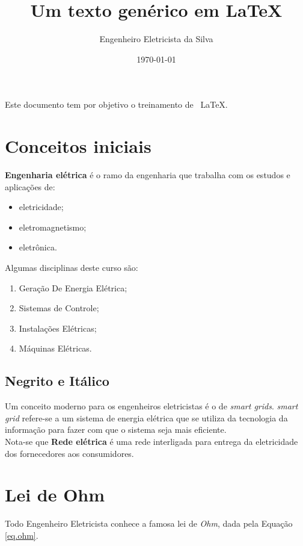 \documentclass[12pt, twocolumn]{article}
\title{Um texto genérico em \LaTeX}
\author{Engenheiro Eletricista da Silva}
\date{\today}
\begin{document}
    \tableofcontents
    \maketitle
    
    Este documento tem por objetivo o treinamento de \ \LaTeX.
    
    \section{Conceitos iniciais}
        
    \textbf{Engenharia elétrica} é o ramo da engenharia que trabalha com os estudos e aplicações de:
    \begin{itemize}
        \item eletricidade;
        \item eletromagnetismo;
        \item eletrônica.
    \end{itemize}
    
    Algumas disciplinas deste curso são: 
    \begin{enumerate}
        \item Geração De Energia Elétrica;
        \item Sistemas de Controle;
        \item Instalações Elétricas;
        \item Máquinas Elétricas.
    \end{enumerate}
    
    \subsection{Negrito e Itálico}
    
    Um conceito moderno para os engenheiros eletricistas é o de \textit{smart grids}. \textit{smart grid} refere-se a um sistema de energia elétrica que se utiliza da tecnologia da informação para fazer com que o sistema seja mais eficiente.\\
    
    Nota-se que \textbf{Rede elétrica }é uma rede interligada para entrega da eletricidade dos fornecedores aos consumidores.
    
    \section{Lei de Ohm}
    
    Todo Engenheiro Eletricista conhece a famosa lei de \textit{Ohm}, dada pela Equação \ref{eq.ohm}.
    
\end{document}
